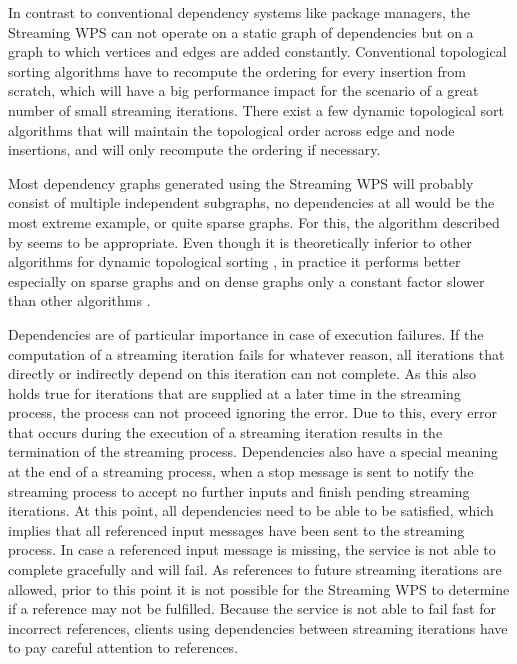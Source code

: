   In contrast to conventional dependency systems like package managers, the Streaming \ac{WPS} can not operate on a static graph of dependencies but on a graph to which vertices and edges are added constantly. Conventional topological sorting algorithms have to recompute the ordering for every insertion from scratch, which will have a big performance impact for the scenario of a great number of small streaming iterations. There exist a few dynamic topological sort algorithms that will maintain the topological order across edge and node insertions, and will only recompute the ordering if necessary.

  Most dependency graphs generated using the Streaming \ac{WPS} will probably consist of multiple independent subgraphs, no dependencies at all would be the most extreme example, or quite sparse graphs. For this, the algorithm described by \citet{pearce2007dynamic} seems to be appropriate. Even though it is theoretically inferior to other algorithms for dynamic topological sorting \citep[e.g. ][]{alpern1990incremental,marchetti1996maintaining}, in practice it performs better especially on sparse graphs and on dense graphs only a constant factor slower than other algorithms \citep{pearce2007dynamic}.

  Dependencies are of particular importance in case of execution failures. If the computation of a streaming iteration fails for whatever reason, all iterations that directly or indirectly depend on this iteration can not complete. As this also holds true for iterations that are supplied at a later time in the streaming process, the process can not proceed ignoring the error. Due to this, every error that occurs during the execution of a streaming iteration results in the termination of the streaming process.
  Dependencies also have a special meaning at the end of a streaming process, when a stop message is sent to notify the streaming process to accept no further inputs and finish pending streaming iterations. At this point, all dependencies need to be able to be satisfied, which implies that all referenced input messages have been sent to the streaming process. In case a referenced input message is missing, the service is not able to complete gracefully and will fail. As references to future streaming iterations are allowed, prior to this point it is not possible for the Streaming \ac{WPS} to determine if a reference may not be fulfilled. Because the service is not able to fail fast for incorrect references, clients using dependencies between streaming iterations have to pay careful attention to references.

